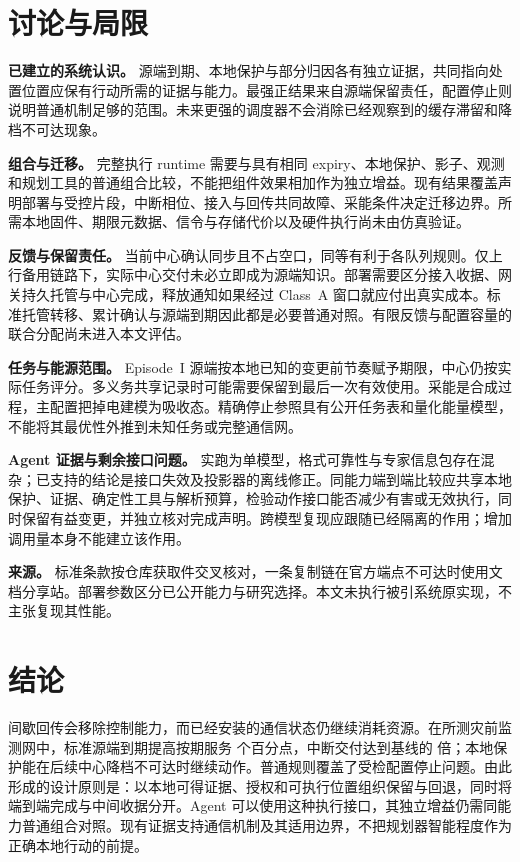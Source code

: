 \documentclass[11pt]{article}
\begin{document}
\section{讨论与局限}
\label{sec:disc}

\textbf{已建立的系统认识。} 源端到期、本地保护与部分归因各有独立证据，共同指向处置位置应保有行动所需的证据与能力。最强正结果来自源端保留责任，配置停止则说明普通机制足够的范围。未来更强的调度器不会消除已经观察到的缓存滞留和降档不可达现象。

\textbf{组合与迁移。} 完整执行 runtime 需要与具有相同 expiry、本地保护、影子、观测和规划工具的普通组合比较，不能把组件效果相加作为独立增益。现有结果覆盖声明部署与受控片段，中断相位、接入与回传共同故障、采能条件决定迁移边界。所需本地固件、期限元数据、信令与存储代价以及硬件执行尚未由仿真验证。

\textbf{反馈与保留责任。} 当前中心确认同步且不占空口，同等有利于各队列规则。仅上行备用链路下，实际中心交付未必立即成为源端知识。部署需要区分接入收据、网关持久托管与中心完成，释放通知如果经过 Class~A 窗口就应付出真实成本。标准托管转移、累计确认与源端到期因此都是必要普通对照。有限反馈与配置容量的联合分配尚未进入本文评估。

\textbf{任务与能源范围。} Episode~I 源端按本地已知的变更前节奏赋予期限，中心仍按实际任务评分。多义务共享记录时可能需要保留到最后一次有效使用。采能是合成过程，主配置把掉电建模为吸收态。精确停止参照具有公开任务表和量化能量模型，不能将其最优性外推到未知任务或完整通信网。

\textbf{Agent 证据与剩余接口问题。} 实跑为单模型，格式可靠性与专家信息包存在混杂；已支持的结论是接口失效及投影器的离线修正。同能力端到端比较应共享本地保护、证据、确定性工具与解析预算，检验动作接口能否减少有害或无效执行，同时保留有益变更，并独立核对完成声明。跨模型复现应跟随已经隔离的作用；增加调用量本身不能建立该作用。

\textbf{来源。} 标准条款按仓库获取件交叉核对，一条复制链在官方端点不可达时使用文档分享站。部署参数区分已公开能力与研究选择。本文未执行被引系统原实现，不主张复现其性能。

\section{结论}
间歇回传会移除控制能力，而已经安装的通信状态仍继续消耗资源。在所测灾前监测网中，标准源端到期提高按期服务 \cThreePairedPoints 个百分点，中断交付达到基线的 \cThreeRatio 倍；本地保护能在后续中心降档不可达时继续动作。普通规则覆盖了受检配置停止问题。由此形成的设计原则是：以本地可得证据、授权和可执行位置组织保留与回退，同时将端到端完成与中间收据分开。Agent 可以使用这种执行接口，其独立增益仍需同能力普通组合对照。现有证据支持通信机制及其适用边界，不把规划器智能程度作为正确本地行动的前提。



\end{document}
